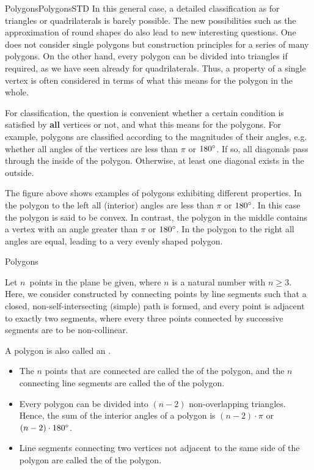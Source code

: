\begin{MXContent}{Polygons}{Polygons}{STD}
In this general case, a detailed classification as for triangles or quadrilaterals is barely 
possible. The new possibilities such as the approximation of round shapes do also lead 
to new interesting questions. One does not consider single polygons but construction 
principles for a series of many polygons. On the other hand, every polygon can be 
divided into triangles if required, as we have seen already for quadrilaterals.
Thus, a property of a single vertex is often considered in terms of what this means
for the polygon in the whole.

For classification, the question is convenient whether a certain condition is satisfied by 
\textbf{all} vertices or not, and what this means for the polygons. For example, polygons 
are classified according to the magnitudes of their angles, e.g. whether all angles of the 
vertices are less than $\pi$ or $180^{\circ}$. If so, all diagonals pass through the inside of the polygon. 
Otherwise, at least one diagonal exists in the outside.

The figure above shows examples of polygons exhibiting different properties. 
In the polygon to the left all (interior) angles are less than $\pi$ or $180^{\circ}$. In this 
case the polygon is said to be convex. In contrast, the polygon in the middle contains a vertex 
with an angle greater than $\pi$ or $180^{\circ}$. In the polygon to the right all angles are 
equal, leading to a very evenly shaped polygon.

\begin{MXInfo}{Polygons}%

Let $n$~points in the plane be given, where $n$ is a natural number with $n \geq 3$.
Here, we consider  constructed by connecting points by 
line segments such that a closed, non-self-intersecting (simple) path is formed, and 
every point is adjacent to exactly two segments, where every three points connected 
by successive segments are to be non-collinear. 

A polygon is also called an . 


\begin{itemize}
\item The $n$ points that are connected are called the 
of the polygon, and the $n$ connecting line segments are called the 
of the polygon.
\item Every polygon can be divided into $(n-2)$ non-overlapping triangles. Hence, the sum of the 
interior angles of a polygon is $(n-2) \cdot \pi$ or $(n-2) \cdot 180^{\circ}$.
\item Line segments connecting two vertices not adjacent to the same side of the 
polygon are called the  of the polygon.
\end{itemize}
\end{MXInfo}


\end{MXContent}
